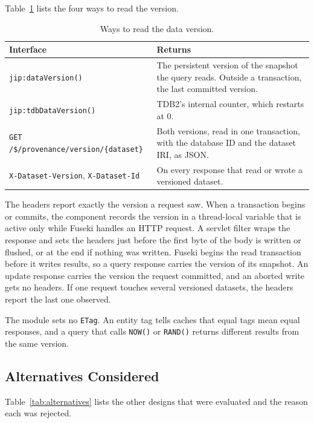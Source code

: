 \documentclass[11pt,a4paper]{article}
\newcommand{\code}[1]{\texttt{#1}}
\begin{document}
Table~\ref{tab:exposure} lists the four ways to read the version.

\begin{table}[ht]
\centering
\caption{Ways to read the data version.}
\label{tab:exposure}
\small
\begin{tabularx}{\linewidth}{@{}>{\raggedright\arraybackslash}p{56mm}>{\raggedright\arraybackslash}X@{}}
\toprule
Interface & Returns \\
\midrule
\code{jip:dataVersion()} & The persistent version of the snapshot the query reads. Outside a
transaction, the last committed version. \\
\code{jip:tdbDataVersion()} & TDB2's internal counter, which restarts at 0. \\
\code{GET /\$/provenance/version/\{dataset\}} & Both versions, read in one transaction, with
the database ID and the dataset IRI, as JSON. \\
\code{X-Dataset-Version}, \code{X-Dataset-Id} & On every response that read or wrote a
versioned dataset. \\
\bottomrule
\end{tabularx}
\end{table}

The headers report exactly the version a request saw. When a transaction begins or commits,
the component records the version in a thread-local variable that is active only while Fuseki
handles an HTTP request. A servlet filter wraps the response and sets the headers just before
the first byte of the body is written or flushed, or at the end if nothing was written. Fuseki
begins the read transaction before it writes results, so a query response carries the version
of its snapshot. An update response carries the version the request committed, and an
aborted write gets no headers. If one request touches several versioned datasets, the headers
report the last one observed.

The module sets no \code{ETag}. An entity tag tells caches that equal tags mean equal
responses, and a query that calls \code{NOW()} or \code{RAND()} returns different results from
the same version.

\subsection{Alternatives Considered}
\label{sec:alternatives}

Table~\ref{tab:alternatives} lists the other designs that were evaluated and the reason each
was rejected.
\end{document}
